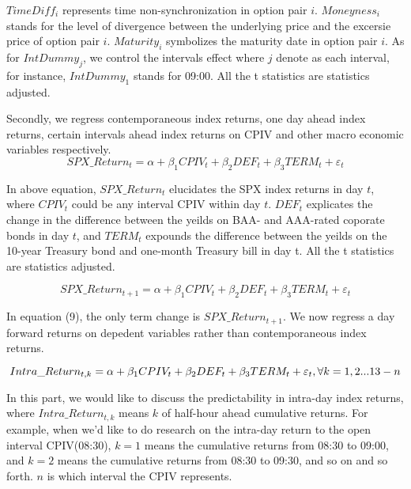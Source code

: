 $TimeDiff_{i}$ represents time non-synchronization in option pair $i$. $Moneyness_{i}$ stands for the level of divergence between the underlying price and the excersie price of option pair $i$. $Maturity_{i}$ symbolizes the maturity date in option pair $i$. As for $IntDummy_{j} $, we control the intervals effect where $j$ denote as each interval, for instance, $IntDummy_{1}$ stands for 09:00. All the t statistics are \citeauthor{newey1986simple} statistics adjusted. 

Secondly, we regress contemporaneous index returns, one day ahead index returns, certain intervals ahead index returns on CPIV and other macro economic variables respectively. 
 \begin{equation}
SPX\_Return_{t} = \alpha + \beta _{1}CPIV_{t} + \beta _{2}DEF_{t} + \beta _{3}TERM_{t} + \varepsilon _{t}
 \end{equation}

In above equation, $SPX\_Return_{t}$ elucidates the SPX index returns in day $t$, where $CPIV_{t}$ could be any interval CPIV within day $t$. $DEF_{t}$ explicates the change in the difference between the yeilds on BAA- and AAA-rated coporate bonds in day $t$, and $TERM_{t}$ expounds the difference between the yeilds on the 10-year Treasury bond and one-month Treasury bill in day t. All the t statistics are \citeauthor{newey1986simple} statistics adjusted. 

\begin{equation}
SPX\_Return_{t+1} = \alpha + \beta _{1}CPIV_{t} + \beta _{2}DEF_{t} + \beta _{3}TERM_{t} + \varepsilon _{t}
\end{equation}

In equation (9), the only term change is $SPX\_Return_{t+1}$. We now regress a day forward returns on depedent variables rather than contemporaneous index returns. 

\begin{equation}
\small
Intra\_Return_{t, k} = \alpha + \beta _{1}CPIV_{t} + \beta _{2}DEF_{t} + \beta _{3}TERM_{t} + \varepsilon _{t},    
\forall k = 1, 2...13-n  
\end{equation}

In this part, we would like to discuss the predictability in intra-day index returns, where $Intra\_Return_{t, k}$ means $k$ of half-hour ahead cumulative returns. For example, when we'd like to do research on the intra-day return to the open interval CPIV(08:30), $k = 1$ means the cumulative returns from 08:30 to 09:00, and  $k = 2$ means the cumulative returns from 08:30 to 09:30, and so on and so forth. $n$ is which interval the CPIV represents. 



